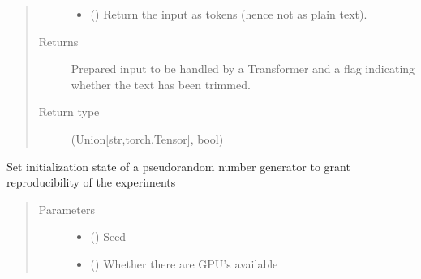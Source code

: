 \documentclass[letterpaper,10pt,english]{sphinxmanual}
\begin{document}
\begin{fulllineitems}
\begin{quote}
\begin{description}
\begin{itemize}
\item {} 
\sphinxAtStartPar
{} (\sphinxstyleliteralemphasis{\sphinxupquote{, }}) \textendash{} Return the input as tokens (hence not as plain text).

\end{itemize}

\item[{Returns}] \leavevmode
\sphinxAtStartPar
Prepared input to be handled by a Transformer and a flag indicating whether the text
has been trimmed.

\item[{Return type}] \leavevmode
\sphinxAtStartPar
(Union{[}str,torch.Tensor{]}, bool)

\end{description}\end{quote}

\end{fulllineitems}


\begin{fulllineitems}
\label{\detokenize{code:utils.set_seed}}
\sphinxAtStartPar
Set initialization state of a pseudo\sphinxhyphen{}random number generator to grant reproducibility
of the experiments
\begin{quote}\begin{description}
\item[{Parameters}] \leavevmode\begin{itemize}
\item {} 
\sphinxAtStartPar
{} () \textendash{} Seed

\item {} 
\sphinxAtStartPar
{} () \textendash{} Whether there are GPU’s available

\end{itemize}

\end{description}\end{quote}

\end{fulllineitems}
\end{document}
